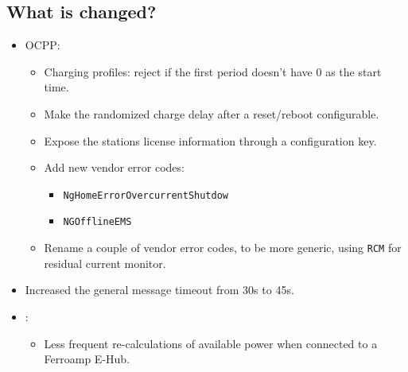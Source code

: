 \documentclass{scrartcl}
\begin{document}
\subsection*{What is changed?}
\begin{itemize}
\item OCPP:
  \begin{itemize}
  \item Charging profiles: reject if the first period doesn't have 0 as the
    start time.
  \item Make the randomized charge delay after a reset/reboot configurable.
  \item Expose the stations license information through a configuration key.
  \item Add new vendor error codes:
    \begin{itemize}
    \item \verb|NgHomeErrorOvercurrentShutdow|
    \item \verb|NGOfflineEMS|
    \end{itemize}
  \item Rename a couple of vendor error codes, to be more generic, using
    \verb|RCM| for residual current monitor.
  \end{itemize}
\item Increased the general message timeout from 30s to 45s.
\item \nanogrid:
  \begin{itemize}
  \item Less frequent re-calculations of available power when connected to a
    Ferroamp E-Hub.
  \end{itemize}
\end{itemize}
\end{document}

